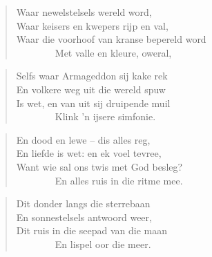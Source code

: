 \begin{verse}
Waar newelstelsels wereld word, \\ 
Waar keisers en kwepers rijp en val, \\ 
Waar die voorhoof van kranse bepereld word \\ 
\ \ \ \ \ \ \ \ Met valle en kleure, oweral, \\ 
\end{verse}

\begin{verse}
Selfs waar Armageddon sij kake rek \\ 
En volkere weg uit die wereld spuw \\ 
Is wet, en van uit sij druipende muil \\ 
\ \ \ \ \ \ \ \ Klink ’n ijsere simfonie. \\ 
\end{verse}

\begin{verse}
En dood en lewe -- dis alles reg, \\ 
En liefde is wet: en ek voel tevree, \\ 
Want wie sal ons twis met God besleg? \\ 
\ \ \ \ \ \ \ \ En alles ruis in die ritme mee. \\ 
\end{verse}

\begin{verse}
Dit donder langs die sterrebaan \\ 
En sonnestelsels antwoord weer, \\ 
Dit ruis in die seepad van die maan \\ 
\ \ \ \ \ \ \ \ En lispel oor die meer. \\ 
\end{verse}